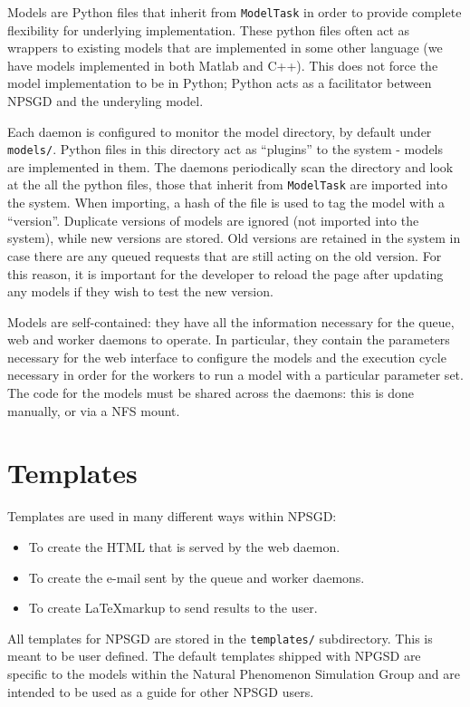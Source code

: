 \documentclass{article}
\newcommand{\mpath}[1]{\texttt{#1}}
\newcommand{\mclass}[1]{\texttt{#1}}
\begin{document}
Models are Python files that inherit from \mclass{ModelTask} in
order to provide complete flexibility for underlying implementation. These
python files often act as wrappers to existing models that are implemented in
some other language (we have models implemented in both Matlab and C++). 
This does not force the model implementation to be in Python;
Python acts as a facilitator between NPSGD and the underyling model. 

Each daemon is configured to monitor the model directory, by default under
\mpath{models/}. Python files in this directory act as ``plugins'' to the system
- models are implemented in them. The daemons periodically scan the directory
and look at the all the python files, those that inherit from \mclass{ModelTask}
are imported into the system. When importing, a hash of the file is used to tag
the model with a ``version''. Duplicate versions of models are ignored (not
imported into the system), while new versions are stored. Old versions are
retained in the system in case there are any queued requests that are still
acting on the old version. For this reason, it is important for the developer to 
reload the page after updating any models if they wish to test the new version.

Models are self-contained: they have all the information necessary for the
queue, web and worker daemons to operate. In particular, they contain the
parameters necessary for the web interface to configure the models and the
execution cycle necessary in order for the workers to run a model with a
particular parameter set. The code for the models must be shared
across the daemons: this is done manually, or via a NFS mount.

\section{Templates}
Templates are used in many different ways within NPSGD:
\begin{itemize}
    \item To create the HTML that is served by the web daemon.
    \item To create the e-mail sent by the queue and worker daemons.
    \item To create \LaTeX markup to send results to the user.
\end{itemize}

All templates for NPSGD are stored in the \mpath{templates/} subdirectory. This
is meant to be user defined. The default templates shipped with NPGSD are 
specific to the models within the Natural Phenomenon Simulation Group and are
intended to be used as a guide for other NPSGD users.
\end{document}
